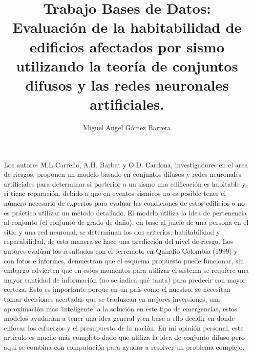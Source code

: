 \documentclass{article}
\title{Trabajo Bases de Datos: Evaluación de la habitabilidad de edificios afectados por sismo utilizando la teoría de conjuntos difusos y las redes neuronales artificiales.}
\author{Miguel Angel Gómez Barrera}
\begin{document}
	\maketitle
\doublespacing
Los autores M.L Carreño, A.H. Barbat y O.D. Cardona, investigadores en el area de riesgos, proponen un modelo basado en conjuntos difusos y redes neuronales artificiales para determinar si posterior a un sismo una edificación es habitable y si tiene reparación, debido a que en eventos sísmicos no es posible tener el número necesario de expertos para evaluar las condiciones de estos edificios o no es práctico utilizar un método detallado. El modelo utiliza la idea de pertenencia al conjunto (el conjunto de grado de daño), en base al juicio de una persona en el sitio y una red neuronal, se determinan los dos criterios: habitabilidad y reparabilidad, de esta manera se hace una predicción del nivel de riesgo. Los autores evalúan los resultados con el terremoto en Quindío Colombia (1999) y con fotos e informes, demuestran que el esquema propuesto puede funcionar, sin embargo advierten que en estos momentos para utilizar el sistema se requiere una mayor cantidad de información (no se indica qué tanta) para predecir con mayor certeza. Esto es importante porque en un país como el nuestro, se necesitan tomar decisiones acertadas que se traduzcan en mejores inversiones, una aproximación mas 'inteligente' a la solución en este tipo de emergencias, estos modelos ayudarían a tener una idea general y en base a ello decidir en donde enfocar los esfuerzos y el presupuesto de la nación. En mi opinión personal, este artículo es mucho más completo dado que utiliza la idea de conjunto difuso pero aquí se combina con computación para ayudar a resolver un problema complejo.

\nocite{*}


\end{document}
